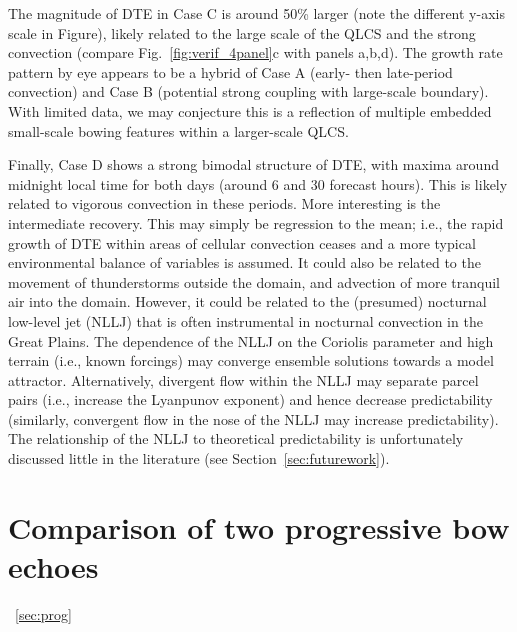 \documentclass{ametsoc}
\begin{document}
The magnitude of DTE in Case C is around 50\% larger (note the different y-axis scale in Figure), likely related to the large scale of the QLCS and the strong convection (compare Fig.~\ref{fig:verif_4panel}c with panels a,b,d). The growth rate pattern by eye appears to be a hybrid of Case A (early- then late-period convection) and Case B (potential strong coupling with large-scale boundary). With limited data, we may conjecture this is a reflection of multiple embedded small-scale bowing features within a larger-scale QLCS.

Finally, Case D shows a strong bimodal structure of DTE, with maxima around midnight local time for both days (around 6 and 30 forecast hours). This is likely related to vigorous convection in these periods. More interesting is the intermediate recovery. This may simply be regression to the mean; i.e., the rapid growth of DTE within areas of cellular convection ceases and a more typical environmental balance of variables is assumed. It could also be related to the movement of thunderstorms outside the domain, and advection of more tranquil air into the domain. However, it could be related to the (presumed) nocturnal low-level jet (NLLJ) that is often instrumental in nocturnal convection in the Great Plains. The dependence of the NLLJ on the Coriolis parameter and high terrain (i.e., known forcings) may converge ensemble solutions towards a model attractor. Alternatively, divergent flow within the NLLJ may separate parcel pairs (i.e., increase the Lyanpunov exponent) and hence decrease predictability (similarly, convergent flow in the nose of the NLLJ may increase predictability). The relationship of the NLLJ to theoretical predictability is unfortunately discussed little in the literature (see Section~\ref{sec:futurework}).

\section{Comparison of two progressive bow echoes}~\ref{sec:prog}
\end{document}
